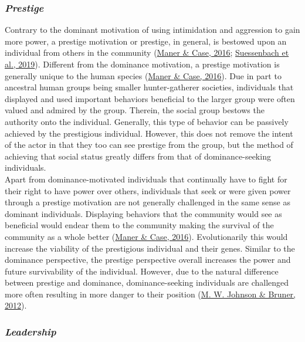 \documentclass[
  donotrepeattitle,doc, 12pt, a4paper,floatsintext]{apa7}
\begin{document}
\hypertarget{prestige}{%
\subsubsection{\texorpdfstring{\emph{Prestige}}{Prestige}}\label{prestige}}

Contrary to the dominant motivation of using intimidation and aggression to gain more power, a prestige motivation or prestige, in general, is bestowed upon an individual from others in the community (\protect\hyperlink{ref-maner2016}{Maner \& Case, 2016}; \protect\hyperlink{ref-suessenbach2019}{Suessenbach et al., 2019}). Different from the dominance motivation, a prestige motivation is generally unique to the human species (\protect\hyperlink{ref-maner2016}{Maner \& Case, 2016}). Due in part to ancestral human groups being smaller hunter-gatherer societies, individuals that displayed and used important behaviors beneficial to the larger group were often valued and admired by the group. Therein, the social group bestows the authority onto the individual. Generally, this type of behavior can be passively achieved by the prestigious individual. However, this does not remove the intent of the actor in that they too can see prestige from the group, but the method of achieving that social status greatly differs from that of dominance-seeking individuals.\\

Apart from dominance-motivated individuals that continually have to fight for their right to have power over others, individuals that seek or were given power through a prestige motivation are not generally challenged in the same sense as dominant individuals. Displaying behaviors that the community would see as beneficial would endear them to the community making the survival of the community as a whole better (\protect\hyperlink{ref-maner2016}{Maner \& Case, 2016}). Evolutionarily this would increase the viability of the prestigious individual and their genes. Similar to the dominance perspective, the prestige perspective overall increases the power and future survivability of the individual. However, due to the natural difference between prestige and dominance, dominance-seeking individuals are challenged more often resulting in more danger to their position (\protect\hyperlink{ref-johnson2012}{M. W. Johnson \& Bruner, 2012}).

\hypertarget{leadership}{%
\subsubsection{\texorpdfstring{\emph{Leadership}}{Leadership}}\label{leadership}}
\end{document}
